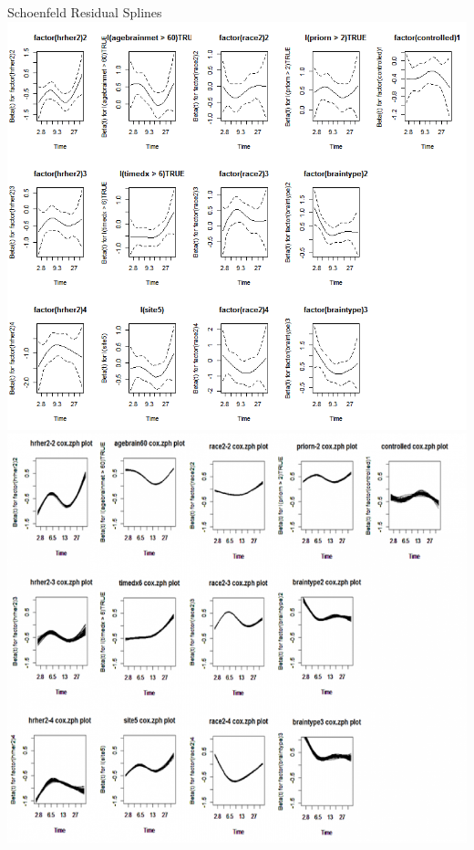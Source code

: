 \begin{frame}{Schoenfeld Residual Splines}
\includegraphics[width=.5\textwidth]{ac_schoenfeld}%
\includegraphics[width=.5\textwidth]{mi_schoenfeld} 
\end{frame}



